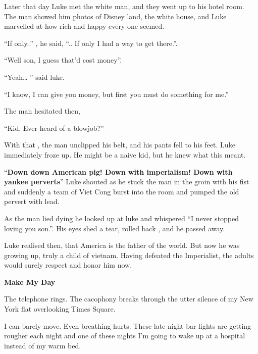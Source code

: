 Later that day Luke met the white man, and they went up to his
hotel room. The man showed him photos of Disney land, the white
house, and Luke marvelled at how rich and happy every one
seemed.



``If only..'' , he said, ``.. If only I had a way to get
there.''.



``Well son, I guess that'd cost money''.



``Yeah{\ldots} '' said luke.



``I know, I can give you money, but first you must do something for
me.''



The man hesitated then,



``Kid. Ever heard of a blowjob?''



With that , the man unclipped his belt, and his pants fell to his
feet. Luke immediately froze up. He might be a naive kid, but he
knew what this meant.



``{\bf Down down American pig! Down with imperialism! Down with yankee
perverts}'' Luke shouted as he stuck the man in the groin with his
fist and suddenly a team of Viet Cong burst into the room and
pumped the old pervert with lead.



As the man lied dying he looked up at luke and whispered ``I never
stopped loving you son.''. His eyes shed a tear, rolled back , and
he passed away.



Luke realised then, that America is the father of the world. But
now he was growing up, truly a child of vietnam. Having defeated
the Imperialist, the adults would surely respect and honor him now.

 





{\bf Make My Day}



The telephone rings. The cacophony breaks through the utter silence
of my New York flat overlooking Times Square.



I can barely move. Even breathing hurts. These late night bar
fights are getting rougher each night and one of these nights
I'm going to wake up at a hospital instead of my warm
bed.



